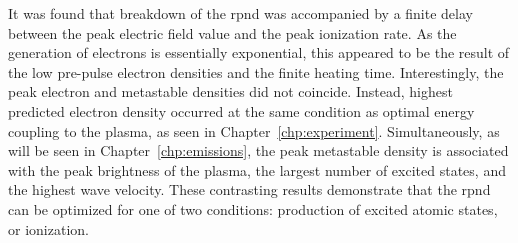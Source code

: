 It was found that breakdown of the \acs{rpnd} was accompanied by a finite delay
between the peak electric field value and the peak ionization rate. As the
generation of electrons is essentially exponential, this appeared to be the
result of the low pre-pulse electron densities and the finite heating time.
Interestingly, the peak electron and metastable densities did not coincide.
Instead, highest predicted electron density occurred at the same condition as
optimal energy coupling to the plasma, as seen in Chapter~\ref{chp:experiment}.
Simultaneously, as will be seen in Chapter~\ref{chp:emissions}, the peak
metastable density is associated with the peak brightness of the plasma, the
largest number of excited states, and the highest wave velocity. These
contrasting results demonstrate that the \acs{rpnd} can be optimized for one of
two conditions: production of excited atomic states, or ionization.
